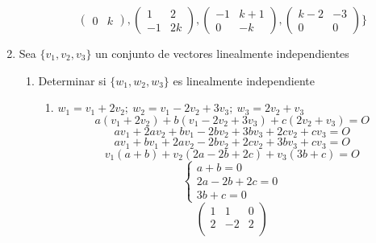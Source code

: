 \documentclass[../practica.root.tex]{subfiles}
\begin{document}
\begin{enumerate}
\begin{enumerate}
\[\begin{pmatrix}
                            0 & k
                        \end{pmatrix},
                        \begin{pmatrix}
                            1  & 2  \\
                            -1 & 2k
                        \end{pmatrix},
                        \begin{pmatrix}
                            -1 & k+1 \\
                            0  & -k
                        \end{pmatrix},
                        \begin{pmatrix}
                            k-2 & -3 \\
                            0   & 0
                        \end{pmatrix}
                        \Bigg\}
                    \]
          \end{enumerate}
    \item Sea $\{ v_1, v_2, v_3 \}$ un conjunto de vectores linealmente independientes
          \begin{enumerate}
              \item Determinar si $\{ w_1, w_2, w_3 \}$ es linealmente independiente
                    \begin{enumerate}
                        \item $ w_1 = v_1 + 2v_2;\ w_2 = v_1 - 2v_2 + 3v_3;\ w_3 = 2v_2 + v_3 $
                              \[ a(v_1 + 2v_2) + b(v_1 - 2v_2 + 3v_3) + c(2v_2 + v_3) = O \]
                              \[ av_1 + 2av_2 + bv_1 - 2bv_2 + 3bv_3 + 2cv_2 + cv_3 = O \]
                              \[ av_1 + bv_1 + 2av_2 - 2bv_2 + 2cv_2 + 3bv_3 + cv_3 = O \]
                              \[ v_1(a + b) + v_2(2a - 2b + 2c) + v_3(3b + c) = O \]
                              \[ \begin{cases}
                                      a + b = 0        \\
                                      2a - 2b + 2c = 0 \\
                                      3b + c = 0
                                  \end{cases} \]
                              \[
                                  \begin{pmatrix}
                                      1 & 1  & 0 \\
                                      2 & -2 & 2 \\

\end{pmatrix}\]
\end{enumerate}
\end{enumerate}
\end{enumerate}
\end{document}
